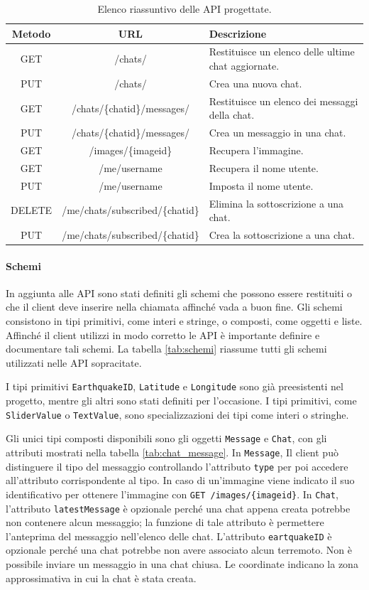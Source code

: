 \begin{table}[ht!]
\centering
\caption{Elenco riassuntivo delle API progettate.}
\label{tab:api}

\begin{tabular}{c|c|p{16em}}
\textbf{Metodo} & \textbf{URL} & \textbf{Descrizione} \\
\hline
GET & /chats/ & Restituisce un elenco delle ultime chat aggiornate. \\
PUT & /chats/ & Crea una nuova chat. \\
GET & /chats/\{chatid\}/messages/ & Restituisce un elenco dei messaggi della chat. \\
PUT & /chats/\{chatid\}/messages/ & Crea un messaggio in una chat. \\
GET & /images/\{imageid\} & Recupera l'immagine. \\
GET & /me/username & Recupera il nome utente. \\
PUT & /me/username & Imposta il nome utente. \\
DELETE & /me/chats/subscribed/\{chatid\} & Elimina la sottoscrizione a una chat. \\
PUT & /me/chats/subscribed/\{chatid\} & Crea la sottoscrizione a una chat.
\end{tabular}
\end{table}

\paragraph{Schemi} In aggiunta alle API sono stati definiti gli schemi che possono essere restituiti o che il client deve inserire nella chiamata affinché vada a buon fine. Gli schemi consistono in tipi primitivi, come interi e stringe, o composti, come oggetti e liste. Affinché il client utilizzi in modo corretto le API è importante definire e documentare tali schemi. La tabella \ref{tab:schemi} riassume tutti gli schemi utilizzati nelle API sopracitate.

I tipi primitivi \texttt{EarthquakeID}, \texttt{Latitude} e \texttt{Longitude} sono già preesistenti nel progetto, mentre gli altri sono stati definiti per l'occasione. I tipi primitivi, come \texttt{SliderValue} o \texttt{TextValue}, sono specializzazioni dei tipi come interi o stringhe.

Gli unici tipi composti disponibili sono gli oggetti \texttt{Message} e \texttt{Chat}, con gli attributi mostrati nella tabella \ref{tab:chat_message}. In \texttt{Message}, Il client può distinguere il tipo del messaggio controllando l'attributo \texttt{type} per poi accedere all'attributo corrispondente al tipo. In caso di un'immagine viene indicato il suo identificativo per ottenere l'immagine con \texttt{GET /images/\{imageid\}}. In \texttt{Chat}, l'attributo \texttt{latestMessage} è opzionale perché una chat appena creata potrebbe non contenere alcun messaggio; la funzione di tale attributo è permettere l'anteprima del messaggio nell'elenco delle chat. L'attributo \texttt{eartquakeID} è opzionale perché una chat potrebbe non avere associato alcun terremoto. Non è possibile inviare un messaggio in una chat chiusa. Le coordinate indicano la zona approssimativa in cui la chat è stata creata.


